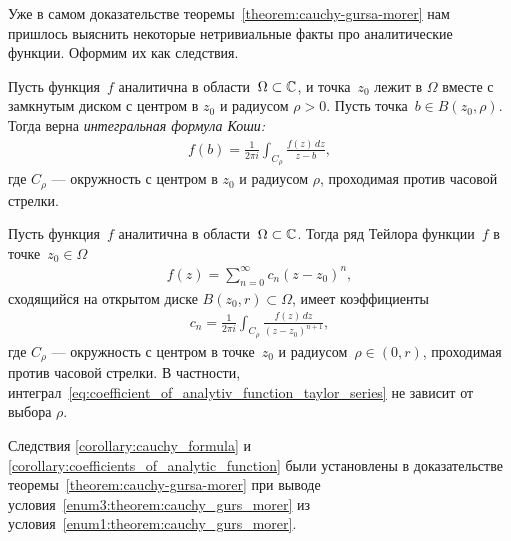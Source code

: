 \documentclass[../complex-analysis.tex]{subfiles}
\begin{document}
Уже в самом доказательстве теоремы~\ref{theorem:cauchy-gursa-morer} нам пришлось выяснить некоторые нетривиальные факты про аналитические функции. Оформим их как следствия.

\begin{crly}
 \label{corollary:cauchy_formula}
 Пусть функция~$ f  $ аналитична в области~$ \Omega \subset \mathbb{C} $, и точка~$ z_0 $ лежит в $ \Omega $ вместе с замкнутым диском с центром в $ z_0 $ и радиусом $ \rho > 0 $. Пусть точка~$ b \in B(z_0,\rho) $. Тогда верна \emph{интегральная формула Коши:}
 \begin{align}
  \label{eq:Cauchy Formula}
  f(b) = \frac{1}{2\pi i} \int_{C_\rho} \frac{f(z)\,dz}{z - b},
 \end{align} где $ C_\rho $ --- окружность с центром в $ z_0 $ и радиусом $ \rho $, проходимая против часовой стрелки.
\end{crly}
\begin{crly}
 \label{corollary:coefficients_of_analytic_function}
 Пусть функция~$ f $ аналитична в области~$ \Omega \subset\mathbb{C}$. Тогда ряд Тейлора функции~$ f $ в точке~$ z_0 \in \Omega $
 \begin{align*}
  f(z) = \sum_{n=0}^{\infty}c_n(z-z_0)^{n},
 \end{align*} сходящийся на открытом диске $ B(z_0,r) \subset \Omega $, имеет коэффициенты
 \begin{align}
  \label{eq:coefficient_of_analytiv_function_taylor_series}
  c_n = \frac{1}{2\pi i} \int_{C_\rho} \frac{f(z)\,dz}{(z-z_0)^{n+1}},
 \end{align} где $ C_\rho $ --- окружность с центром в точке~$ z_0 $ и радиусом~$ \rho \in (0, r) $, проходимая против часовой стрелки. В частности, интеграл~\eqref{eq:coefficient_of_analytiv_function_taylor_series} не зависит от выбора $ \rho $.
\end{crly}

Следствия \ref{corollary:cauchy_formula} и \ref{corollary:coefficients_of_analytic_function} были установлены в доказательстве теоремы~\ref{theorem:cauchy-gursa-morer} при выводе условия~\ref{enum3:theorem:cauchy_gurs_morer} из условия~\ref{enum1:theorem:cauchy_gurs_morer}. 
\end{document}
